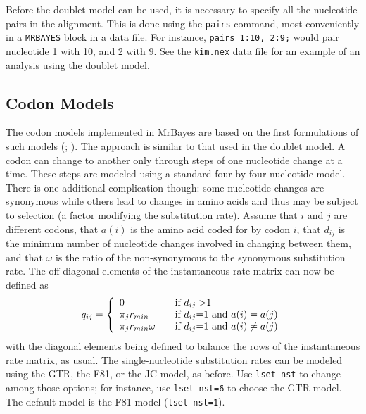 \documentclass[12pt]{book}
\begin{document}
Before the doublet model can be used, it is necessary to specify all the nucleotide pairs in the
alignment. This is done using the \texttt{pairs} command, most conveniently in a \texttt{MRBAYES}
block in a data file. For instance, \texttt{pairs 1:10, 2:9;} would pair nucleotide 1 with 10, and
2 with 9. See the \texttt{kim.nex} data file for an example of an analysis using the doublet model.

\subsection{Codon Models}

The codon models implemented in MrBayes are based on the first formulations of such models
(\citet{goldman94}; \citet{muse94}). The approach is similar to that used in the doublet model. A
codon can change to another only through steps of one nucleotide change at a time. These steps are
modeled using a standard four by four nucleotide model. There is one additional complication
though: some nucleotide changes are synonymous while others lead to changes in amino acids and thus
may be subject to selection (a factor modifying the substitution rate). Assume that $i$ and $j$ are
different codons, that $a(i)$ is the amino acid coded for by codon $i$, that $d_{ij}$ is the
minimum number of nucleotide changes involved in changing between them, and that $\omega$ is the
ratio of the non-synonymous to the synonymous substitution rate. The off-diagonal elements of the
instantaneous rate matrix can now be defined as
\[
q_{ij} = \left\{
\begin{array}{l l}
  0 & \quad \text{if $d_{ij}>$1 } \\
 \pi_j r_{min} & \quad \text{if $d_{ij}$=1 and $a(i)=a(j)$}\\
 \pi_j r_{min} \omega & \quad \text{if $d_{ij}$=1 and $a(i)\neq a(j)$}\\
\end{array} \right.
\]
with the diagonal elements being defined to balance the rows of the instantaneous rate matrix, as
usual. The single-nucleotide substitution rates can be modeled using the GTR, the F81, or the JC
model, as before. Use \texttt{lset nst} to change among those options; for instance, use
\texttt{lset nst=6} to choose the GTR model. The default model is the F81 model (\texttt{lset
nst=1}).
\end{document}
